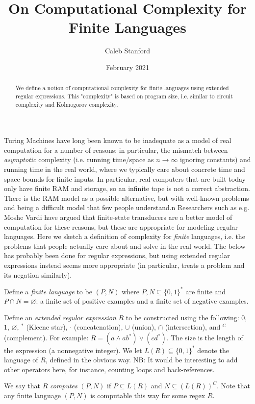 \documentclass{article}
\title{On Computational Complexity for Finite Languages}
\author{Caleb Stanford}
\date{February 2021}
\begin{document}
\maketitle

\begin{abstract}
We define a notion of computational complexity
for finite languages using extended regular expressions.
This "complexity" is based on program size,
i.e. similar to circuit complexity and Kolmogorov complexity.
\end{abstract}

Turing Machines have long been known to be inadequate as a model of real computation for a number of reasons; in particular, the mismatch between \emph{asymptotic} complexity (i.e. running time/space as $n \to \infty$ ignoring constants) and running time in the real world, where we typically care about concrete time and space bounds for finite inputs. In particular, real computers that are built today only have finite RAM and storage, so an infinite tape is not a correct abstraction.
There is the RAM model as a possible alternative, but with well-known problems and being a difficult model that few people understand.n
Researchers such as e.g. Moshe Vardi have argued that finite-state transducers are a better model of computation for these reasons, but these are appropriate for modeling regular languages.
Here we sketch a definition of complexity for \emph{finite} languages, i.e. the problems that people actually
care about and solve in the real world.
The below has probably been done for regular expressions, but using extended regular expressions instead seems more appropriate (in particular, treats a problem and its negation similarly).

Define a \emph{finite language} to be $(P, N)$ where $P, N \subseteq \{0, 1\}^{*}$ are finite
and $P \cap N = \varnothing$: a finite set of positive examples and a finite set of negative examples.

Define an \emph{extended regular expression} $R$ to be constructed using the following:
$0$, $1$, $\varnothing$, $^{*}$ (Kleene star), $\cdot$ (concatenation), $\cup$ (union), $\cap$ (intersection), and $^C$ (complement).
For example: $R = (a \land ab^{*}) \lor (cd^{*})$.
The size is the length of the expression (a nonnegative integer).
We let $L(R) \subseteq \{0, 1\}^{*}$ denote the language of $R$, defined in the obvious way.
NB: It would be interesting to add other operators here, for instance, counting loops and
back-references.

We say that $R$ \emph{computes} $(P, N)$ if $P \subseteq L(R)$ and $N \subseteq (L(R))^C$.
Note that any finite language $(P, N)$ is computable this way for some regex $R$.
\end{document}
